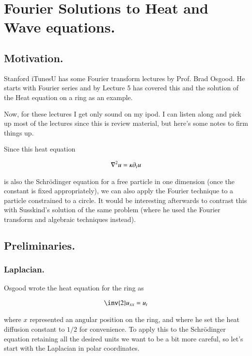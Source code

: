 \chapter{Fourier Solutions to Heat and Wave equations.}\label{chap:PJheatFourier}
\date{ Jan 19, 2009.  Last Revision: $Date: 2009/06/04 13:13:27 $ }

\section{Motivation. }

Stanford iTunesU has some Fourier transform lectures by Prof. Brad Osgood.
He starts with Fourier series and by Lecture 5 has covered this and
the solution of the Heat equation on a ring as an example.

Now, for these lectures I get only sound on my ipod.  I can listen along and
pick up most of the lectures since this is review material, but here's some
notes to firm things up.

Since this heat equation

\begin{align}
\nabla^2 u = \kappa \partial_t u
\end{align}

is also the Schr\"{o}dinger equation for a free particle in one 
dimension (once the 
constant is fixed appropriately), we can also apply the Fourier
technique to a particle
constrained to a circle.  It would be interesting afterwards to 
contrast this with Susskind's solution of the
same problem (where he used the Fourier transform and algebraic techniques
instead).

\section{Preliminaries. }

\subsection{Laplacian. }

Osgood wrote the heat equation for the ring as

\begin{align*}
\inv{2} u_{xx} = u_t
\end{align*}

where $x$ represented an angular position on the ring, and where
he set the heat diffusion constant to $1/2$ for convenience.
To apply this to the Schr\"{o}dinger equation retaining all the desired
units we want to be a bit more careful, so let's start with the Laplacian
in polar coordinates.

